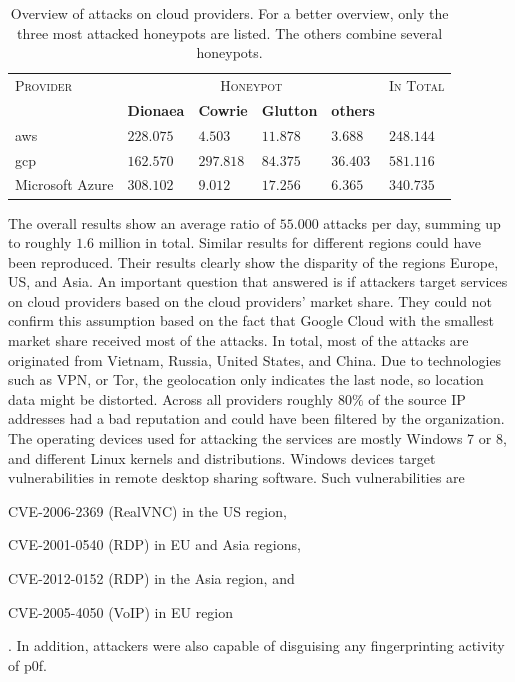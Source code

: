 \begin{table}
    \centering
    \caption[Overview of attacks on cloud providers]{Overview of attacks on cloud providers. For a better overview, only the three most attacked honeypots are listed. The others combine several honeypots.}
    \begin{tabularx}{\linewidth}{l|XXXX|l}
        \toprule
        \textsc{Provider} & \multicolumn{4}{c|}{\textsc{Honeypot}} & \textsc{In Total}                                                  \\
                          & \textbf{Dionaea}                       & \textbf{Cowrie}   & \textbf{Glutton} & \textbf{others} &           \\
        \hline
        \acl{aws}         & $228.075$                              & $4.503$           & $11.878$         & $3.688$         & $248.144$ \\
        \acl{gcp}         & $162.570$                              & $297.818$         & $84.375$         & $36.403$        & $581.116$ \\
        Microsoft Azure   & $308.102$                              & $9.012$           & $17.256$         & $6.365$         & $340.735$ \\
        \bottomrule
    \end{tabularx}
    \label{tab:overview-cloud-security}
\end{table}

The overall results show an average ratio of $55.000$ attacks per day, summing up to roughly $1.6$ million in total.
Similar results for different regions could have been reproduced.
Their results clearly show the disparity of the regions Europe, US, and Asia.
An important question that \citet{Kelly2021} answered is if attackers target services on cloud providers based on the cloud providers' market share.
They could not confirm this assumption based on the fact that Google Cloud with the smallest market share received most of the attacks.
In total, most of the attacks are originated from Vietnam, Russia, United States, and China.
Due to technologies such as VPN, or Tor, the geolocation only indicates the last node, so location data might be distorted.
Across all providers roughly $80\%$ of the source IP addresses had a bad reputation and could have been filtered by the organization.
The operating devices used for attacking the services are mostly Windows 7 or 8, and different Linux kernels and distributions.
Windows devices target vulnerabilities in remote desktop sharing software. Such vulnerabilities are
\begin{enumerate*}[label=(\roman*)]
    \item CVE-2006-2369\cite{CVE-2006-2369} (RealVNC) in the US region,
    \item CVE-2001-0540\cite{CVE-2001-0540} (RDP) in EU and Asia regions,
    \item CVE-2012-0152\cite{CVE-2012-0152} (RDP) in the Asia region, and
    \item CVE-2005-4050\cite{CVE-2005-4050} (VoIP) in EU region
\end{enumerate*}.
In addition, attackers were also capable of disguising any fingerprinting activity of p0f.

